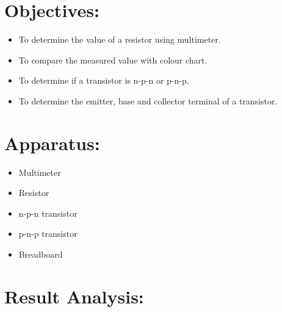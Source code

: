 \documentclass[a4paper, 14pt]{extarticle}
\begin{document}
    \section{Objectives:}
        \begin{itemize}
            \item To determine the value of a resistor using multimeter.
            \item To compare the measured value with colour chart.
            \item To determine if a transistor is n-p-n or p-n-p.
            \item To determine the emitter, base and collector terminal of a transistor.
        \end{itemize}

    \section{Apparatus:}
        \begin{itemize}
            \item Multimeter
            \item Resistor
            \item n-p-n transistor 
            \item p-n-p transistor
            \item Breadboard
        \end{itemize}

    \newpage

    \section{Result Analysis:}
\end{document}
